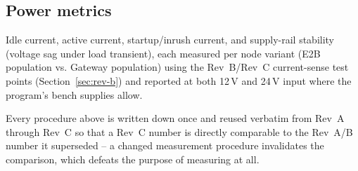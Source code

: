 \subsection{Power metrics}

Idle current, active current, startup/inrush current, and supply-rail stability (voltage sag under load transient), each measured per node variant (E2B population vs. Gateway population) using the Rev~B/Rev~C current-sense test points (Section~\ref{sec:rev-b}) and reported at both 12\,V and 24\,V input where the program's bench supplies allow.

Every procedure above is written down once and reused verbatim from Rev~A through Rev~C so that a Rev~C number is directly comparable to the Rev~A/B number it superseded -- a changed measurement procedure invalidates the comparison, which defeats the purpose of measuring at all.
